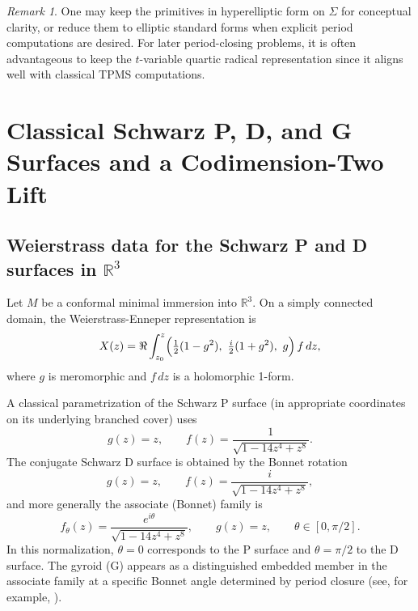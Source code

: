 \documentclass[12pt]{article}
\numberwithin{equation}{section}
\theoremstyle{definition}
\theoremstyle{remark}
\newtheorem{remark}[theorem]{Remark}
\begin{document}
\begin{remark}
One may keep the primitives in hyperelliptic form on $\Sigma$ for conceptual clarity, or reduce them to elliptic standard forms when explicit period computations are desired.
For later period-closing problems, it is often advantageous to keep the $t$-variable quartic radical representation since it aligns well with classical TPMS computations.
\end{remark}

\section{Classical Schwarz P, D, and G Surfaces and a Codimension-Two Lift}\label{sec:PDG}

\subsection{Weierstrass data for the Schwarz P and D surfaces in $\mathbb{R}^3$}

Let $M$ be a conformal minimal immersion into $\mathbb{R}^3$.
On a simply connected domain, the Weierstrass-Enneper representation is
\begin{equation}\label{eq:WE-R3}
X(z)=\Re\int_{z_0}^z \Bigl(\tfrac12(1-g^2),\ \tfrac{i}{2}(1+g^2),\ g\Bigr)\,f\,dz,
\end{equation}
where $g$ is meromorphic and $f\,dz$ is a holomorphic 1-form.

A classical parametrization of the Schwarz P surface (in appropriate coordinates on its underlying branched cover) uses
\begin{equation}\label{eq:SchwarzPDdata}
g(z)=z,
\qquad
f(z)=\frac{1}{\sqrt{1-14z^4+z^8}}.
\end{equation}
The conjugate Schwarz D surface is obtained by the Bonnet rotation
\begin{equation}\label{eq:Ddata}
g(z)=z,
\qquad
f(z)=\frac{i}{\sqrt{1-14z^4+z^8}},
\end{equation}
and more generally the associate (Bonnet) family is
\begin{equation}\label{eq:associate-family}
f_\theta(z)=\frac{e^{i\theta}}{\sqrt{1-14z^4+z^8}},
\qquad
g(z)=z,
\qquad
\theta\in[0,\pi/2].
\end{equation}
In this normalization, $\theta=0$ corresponds to the P surface and $\theta=\pi/2$ to the D surface.
The gyroid (G) appears as a distinguished embedded member in the associate family at a specific Bonnet angle determined by period closure (see, for example, \cite{WeyhauptGyroid,GBrauckmannSurvey}).
\end{document}
